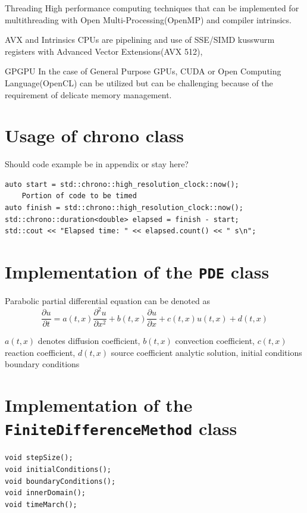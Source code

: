\documentclass[12pt, oneside]{book}
\theoremstyle{plain}
\theoremstyle{definition}
\begin{document}
Threading
High performance computing techniques that can be implemented for multithreading with Open Multi-Processing(OpenMP) and compiler intrinsics.

AVX and Intrinsics
CPUs are pipelining and use of SSE/SIMD kusswurm registers with Advanced Vector Extensions(AVX 512),

GPGPU
 In the case of General Purpose GPUs, CUDA or Open Computing Language(OpenCL) can be utilized but can be challenging because of the requirement of delicate memory management.

\appendix
\chapter{Usage of chrono class}
Should code example be in appendix or stay here?
\begin{verbatim}
auto start = std::chrono::high_resolution_clock::now();
    Portion of code to be timed
auto finish = std::chrono::high_resolution_clock::now();
std::chrono::duration<double> elapsed = finish - start;
std::cout << "Elapsed time: " << elapsed.count() << " s\n";
\end{verbatim}

\chapter{Implementation of the {\tt PDE} class}
Parabolic partial differential equation can be denoted as
$$ \frac{\partial u}{\partial t} = a(t,x) \frac{\partial^2 u}{\partial x^2} + b(t,x) \frac{\partial u}{\partial x} + c(t,x) u(t,x) + d(t,x) $$

$a(t,x)$ denotes diffusion coefficient,  $b(t,x)$ convection coefficient, $c(t,x)$ reaction coefficient, $d(t,x)$ source coefficient
analytic solution, initial conditions boundary conditions
\chapter{Implementation of the {\tt FiniteDifferenceMethod} class}

\begin{verbatim}
void stepSize();
void initialConditions();
void boundaryConditions();
void innerDomain();
void timeMarch();
\end{verbatim}





\end{document}
